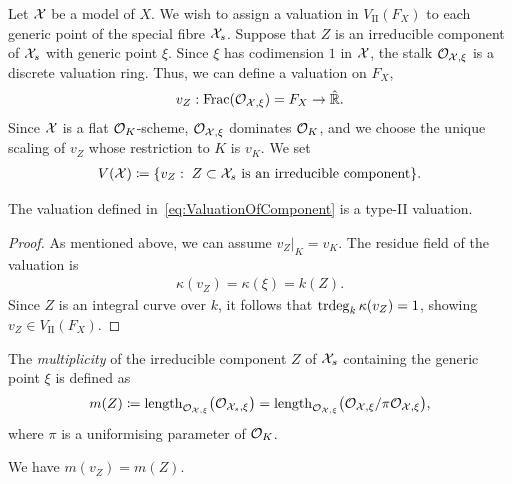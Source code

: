 Let $\mathcal X$ be a model of $X$.
We wish to assign a valuation in $V_\textrm{II}(F_X)$ to each generic point of the special fibre $\mathcal X_s$.
Suppose that $Z$ is an irreducible component of $\mathcal X_s$ with generic point $\xi$.
Since $\xi$ has codimension $1$ in $\mathcal X$, the stalk $\mathcal{O}_{\mathcal X,\xi}$ is a discrete valuation ring\@.
Thus, we can define a valuation on $F_X$,
\begin{align} \label{eq:ValuationOfComponent}
    v_Z: \mathrm{Frac}(\mathcal{O}_{\mathcal X, \xi}) = F_X \to \hat{\mathbb R}.
\end{align}
Since $\mathcal X$ is a flat $\mathcal O_K $-scheme, $\mathcal{O}_{\mathcal X, \xi}$ dominates $\mathcal O_K$, and we choose the unique scaling of $v_Z$ whose restriction to $K$ is $v_K$.
We set
\begin{align}
    V(\mathcal X) \coloneqq \lbrace v_Z: \; Z \subset \mathcal X_s \text{ is an irreducible component}\rbrace.
\end{align}

\begin{proposition}\label{prop:WellDefOfInducedValuation}
    The valuation defined in~\eqref{eq:ValuationOfComponent} is a type-II valuation.
\end{proposition}

\begin{proof}
    As mentioned above, we can assume $v_Z|_K = v_K$.
    The residue field of the valuation is
    \begin{align}
        \kappa(v_Z)=\kappa(\xi)=k(Z).
    \end{align}
    Since $Z$ is an integral curve over $k$, it follows that
    $\operatorname{trdeg}_k \kappa(v_Z)=1$, showing $v_Z \in V_\textrm{II}(F_X)$.
\end{proof}

\begin{definition}
    The \textit{multiplicity} of the irreducible component $Z$ of $\mathcal X_s$ containing the generic point $\xi$ is defined as
    \begin{align}
        m(Z)
        \coloneqq \operatorname{length}_{\mathcal{O}_{\mathcal X,\xi}}\bigl(\mathcal{O}_{\mathcal X_s,\xi}\bigr)
        = \operatorname{length}_{\mathcal{O}_{\mathcal X,\xi}}\bigl(\mathcal{O}_{\mathcal X,\xi}/\pi\mathcal{O}_{\mathcal X,\xi}\bigr),
    \end{align}
    where $\pi$ is a uniformising parameter of $\mathcal O_K$.
\end{definition}

\begin{proposition}\label{prop:multiplicities-coincide}
    We have $m(v_Z) = m(Z)$.
\end{proposition}

